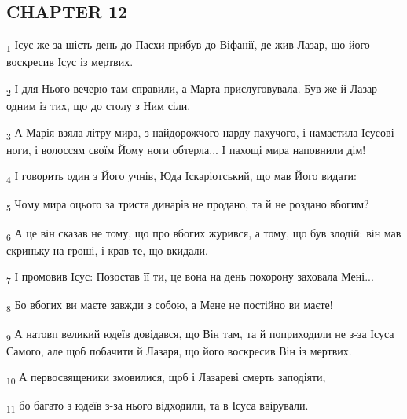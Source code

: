 \subsection{CHAPTER 12}
\begin{tcolorbox}
\textsubscript{1} Ісус же за шість день до Пасхи прибув до Віфанії, де жив Лазар, що його воскресив Ісус із мертвих.
\end{tcolorbox}
\begin{tcolorbox}
\textsubscript{2} І для Нього вечерю там справили, а Марта прислуговувала. Був же й Лазар одним із тих, що до столу з Ним сіли.
\end{tcolorbox}
\begin{tcolorbox}
\textsubscript{3} А Марія взяла літру мира, з найдорожчого нарду пахучого, і намастила Ісусові ноги, і волоссям своїм Йому ноги обтерла... І пахощі мира наповнили дім!
\end{tcolorbox}
\begin{tcolorbox}
\textsubscript{4} І говорить один з Його учнів, Юда Іскаріотський, що мав Його видати:
\end{tcolorbox}
\begin{tcolorbox}
\textsubscript{5} Чому мира оцього за триста динарів не продано, та й не роздано вбогим?
\end{tcolorbox}
\begin{tcolorbox}
\textsubscript{6} А це він сказав не тому, що про вбогих журився, а тому, що був злодій: він мав скриньку на гроші, і крав те, що вкидали.
\end{tcolorbox}
\begin{tcolorbox}
\textsubscript{7} І промовив Ісус: Позостав її ти, це вона на день похорону заховала Мені...
\end{tcolorbox}
\begin{tcolorbox}
\textsubscript{8} Бо вбогих ви маєте завжди з собою, а Мене не постійно ви маєте!
\end{tcolorbox}
\begin{tcolorbox}
\textsubscript{9} А натовп великий юдеїв довідався, що Він там, та й поприходили не з-за Ісуса Самого, але щоб побачити й Лазаря, що його воскресив Він із мертвих.
\end{tcolorbox}
\begin{tcolorbox}
\textsubscript{10} А первосвященики змовилися, щоб і Лазареві смерть заподіяти,
\end{tcolorbox}
\begin{tcolorbox}
\textsubscript{11} бо багато з юдеїв з-за нього відходили, та в Ісуса ввірували.
\end{tcolorbox}

